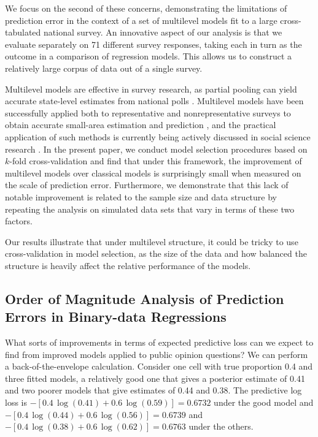 \documentclass[sii]{ipart}
\begin{document}
We focus on the second of these concerns, demonstrating the limitations of
prediction error in the context of a set of multilevel models fit to a large
cross-tabulated national survey.  An innovative aspect of our analysis is that we
evaluate separately on 71 different survey responses, taking each in turn as the
outcome in a comparison of regression models.  This allows us to construct a
relatively large corpus of data out of a single survey.

Multilevel models are effective in survey research, as partial pooling can yield
accurate state-level estimates from national polls
\citep{gelman2007data}. Multilevel models have been successfully applied both to
representative and nonrepresentative surveys to obtain accurate small-area
estimation and prediction \citep{FayHerriot:1979, lax_2009, ghitza_2013,
  wang_2014}, and the practical application of such methods is currently being
actively discussed in social science research \citep{buttice_2013, lax_2013}. In
the present paper, we conduct model selection procedures based on $k$-fold
cross-validation and find that under this framework, the improvement of
multilevel models over classical models is surprisingly small when measured on
the scale of prediction error. Furthermore, we demonstrate that this lack of
notable improvement is related to the sample size and data structure by repeating
the analysis on simulated data sets that vary in terms of these two factors.

Our results illustrate that under multilevel structure, it could be tricky to
use cross-validation in model selection, as the size of the data and how balanced
the structure is heavily affect the relative performance of the models.



\subsection{Order of Magnitude Analysis of Prediction Errors in Binary-data Regressions}

What sorts of improvements in terms of expected predictive loss can we expect to
find from improved models applied to public opinion questions?  We can perform a
back-of-the-envelope calculation. Consider one cell with true proportion 0.4 and
three fitted models, a relatively good one that gives a posterior estimate of
0.41 and two poorer models that give estimates of 0.44 and 0.38.  The predictive
log loss is $-[0.4\,\log(0.41)+0.6\,\log(0.59)]=0.6732$ under the good model and
$-[0.4\,\log(0.44)+0.6\,\log(0.56)]=0.6739$ and
$-[0.4\,\log(0.38)+0.6\,\log(0.62)]=0.6763$ under the others.
\end{document}

